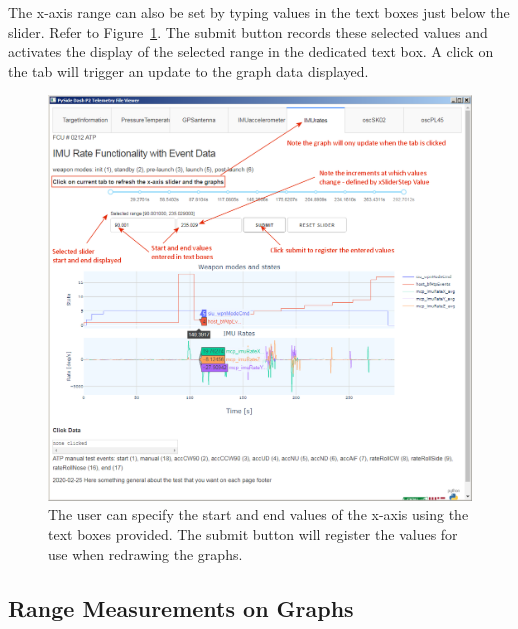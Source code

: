 \clearpage

The x-axis range can also be set by typing values in the text boxes just below the slider. Refer to Figure~\ref{fig:dashview-subPlot2Slider3}. The submit button records these selected values and activates the display of the selected range in the dedicated text box. A click on the tab will trigger an update to the graph data displayed.

\begin{figure}[h]
\centering
\includegraphics[width=\textwidth]{pic/dashview-subPlot2Slider3}
\caption{The user can specify the start and end values of the x-axis using the text boxes provided. The submit button will register the values for use when redrawing the graphs.
\label{fig:dashview-subPlot2Slider3}}
\end{figure}

\clearpage
\subsection{Range Measurements on Graphs}

